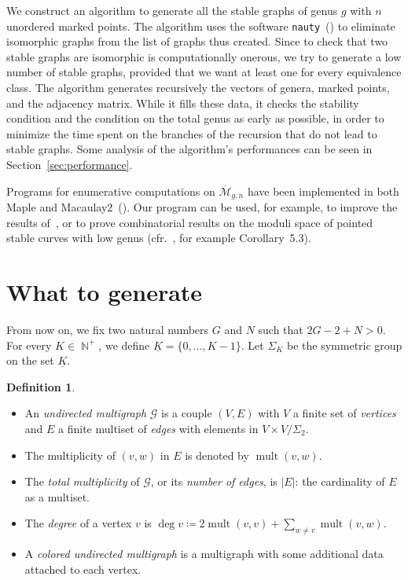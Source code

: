 \documentclass{amsart}
\theoremstyle{plain}
\theoremstyle{definition}
\newtheorem{definition}[theorem]{Definition}
\DeclareMathOperator{\bN}{\mathbb{N}}
\DeclareMathOperator{\mult}{mult}
\newcommand{\graph}{\mathcal{G}}
\newcommand{\abs}[1]{\left|#1\right|}
\newcommand{\ubar}[1]{\underline{#1}}
\begin{document}
We construct an algorithm to generate all the stable graphs of genus
$g$ with $n$ unordered marked points. The algorithm uses the software
\texttt{nauty}~(\cite{nauty}) to eliminate isomorphic graphs from the
list of graphs thus created. Since to check that two stable graphs are
isomorphic is computationally onerous, we try to generate a low number
of stable graphs, provided that we want at least one for every
equivalence class. The algorithm generates recursively the vectors of
genera, marked points, and the adjacency matrix. While it fills these
data, it checks the stability condition and the condition on the total
genus as early as possible, in order to minimize the time spent on the
branches of the recursion that do not lead to stable graphs. Some
analysis of the algorithm's performances can be seen in
Section~\ref{sec:performance}.

Programs for enumerative computations on
$\overline{\mathcal{M}}_{g,n}$ have been implemented in both Maple and
Macaulay2~(\cite{faber,stephanie1,smith}). Our program can be used,
for example, to improve the results of~\cite[Section 5]{stephanie2},
or to prove combinatorial results on the moduli space of pointed
stable curves with low genus (cfr.~\cite{busonero}, for example
Corollary~5.3).



\section{What to generate}

From now on, we fix two natural numbers $G$ and $N$ such that $2
G-2+N>0$.  For every $K \in \bN^+$, we define $\ubar{K} = \{0, \dots,
K-1\}$. Let $\Sigma_K$ be the symmetric group on the set $\ubar{K}$.

\begin{definition}
  \mbox{}
  \begin{itemize}
  \item An \emph{undirected multigraph\/} $\graph$ is a couple $(V,
    E)$ with $V$ a finite set of \emph{vertices\/} and $E$ a finite
    multiset of \emph{edges\/} with elements in $V \times V/\Sigma_2$.
  \item The multiplicity of $(v, w)$ in $E$ is denoted by $\mult(v,
    w)$.
  \item The \emph{total multiplicity\/} of $\graph$, or its
    \emph{number of edges}, is $\abs{E}$: the cardinality of $E$ as a
    multiset.
  \item The \emph{degree\/} of a vertex $v$ is $\deg v \coloneqq 2
    \mult(v, v) + \sum_{w \neq v} \mult(v, w)$.
  \item A \emph{colored undirected multigraph\/} is a multigraph with
    some additional data attached to each vertex.
  \end{itemize}
\end{definition}
\end{document}
